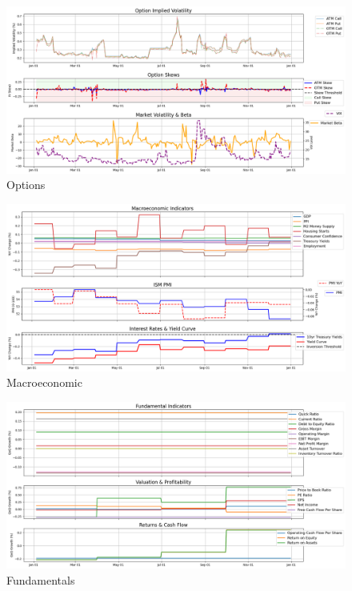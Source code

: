 \documentclass[8pt]{scrartcl}
\begin{document}
\begin{figure}[H]
    \centering
    \includegraphics[width=1\linewidth]{judge_reviews/META_M_gpt-4o-mini/2016-01-04/judge_Option_Implied_Volatility.png}
    \caption{Options}
\end{figure}

\begin{figure}[H]
    \centering
    \includegraphics[width=1\linewidth]{judge_reviews/META_M_gpt-4o-mini/2016-01-04/judge_Macroeconomic_Indicators.png}
    \caption{Macroeconomic}
\end{figure}

\begin{figure}[H]
    \centering
    \includegraphics[width=1\linewidth]{judge_reviews/META_M_gpt-4o-mini/2016-01-04/judge_Fundamental_Indicators.png}
    \caption{Fundamentals}
\end{figure}
\end{document}

